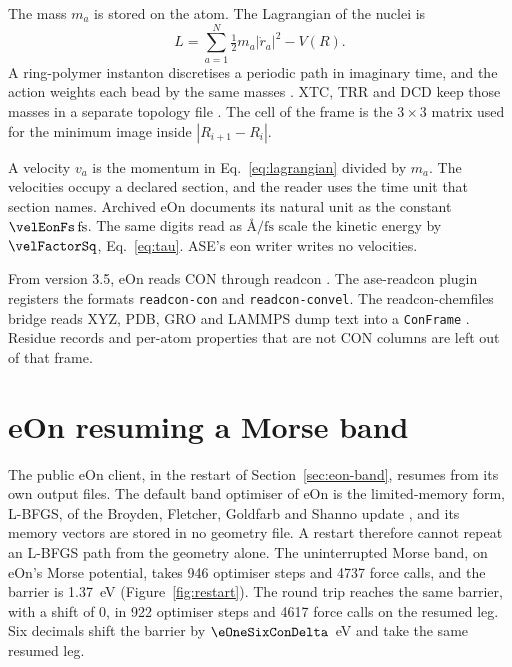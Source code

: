 The mass \(m_a\) is stored on the atom.
The Lagrangian of the nuclei is
\begin{equation}
\label{eq:lagrangian}
L=\sum_{a=1}^{N}\tfrac12 m_a|\dot r_a|^{2}-V(R).
\end{equation}
A ring-polymer instanton discretises a periodic path in imaginary time, and the action weights each bead by the same masses
\cite{richardsonRingpolymerInstanton2018}.
XTC, TRR and DCD keep those masses in a separate topology file
\cite{abrahamGromacsHighPerformance2015,brooksCharmmBiomolecularSimulation2009}.
The cell of the frame is the \(3\times 3\) matrix used for the minimum image inside \(|R_{i+1}-R_i|\).

A velocity \(v_a\) is the momentum in Eq.~\eqref{eq:lagrangian} divided by \(m_a\).
The velocities occupy a declared section, and the reader uses the time unit that section names.
Archived eOn documents its natural unit as the constant \(\velEonFs\,\mathrm{fs}\).
The same digits read as \(\text{\AA}/\mathrm{fs}\) scale the kinetic energy by \(\velFactorSq\), Eq.~\eqref{eq:tau}.
ASE's eon writer writes no velocities.

From version 3.5, eOn reads CON through readcon
\cite{chillEonSoftwareLong2014,rohitgoswamiTheochemuieonV3602026}.
The ase-readcon plugin registers the formats \texttt{readcon-con} and \texttt{readcon-convel}.
The readcon-chemfiles bridge reads XYZ, PDB, GRO and LAMMPS dump text into a \texttt{ConFrame}
\cite{frauxChemfileschemfilesVersion01042023}.
Residue records and per-atom properties that are not CON columns are left out of that frame.

\section{eOn resuming a Morse band}\label{sec:supp-morse}
The public eOn client, in the restart of Section~\ref{sec:eon-band}, resumes from its own output files.
The default band optimiser of eOn is the limited-memory form, L-BFGS, of
the Broyden, Fletcher, Goldfarb and Shanno update
\cite{nocedalUpdatingQuasinewtonMatrices1980,sheppardOptimizationMethodsFinding2008},
and its memory vectors are stored in no geometry file.
A restart therefore cannot repeat an L-BFGS path from the geometry alone.
The uninterrupted Morse band, on eOn's Morse potential, takes 946 optimiser steps and 4737 force calls, and the barrier is 1.37~eV (Figure~\ref{fig:restart}).
The round trip reaches the same barrier, with a shift of 0, in 922 optimiser steps and 4617 force calls on the resumed leg.
Six decimals shift the barrier by \(\eOneSixConDelta\)~eV and take the same resumed leg.

